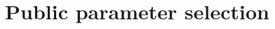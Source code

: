 \documentclass{llncs}
\newcommand{\F}{\mathbb{F}}
\newcommand{\algstyle}[1]{\textsc{#1}}
\begin{document}


\section{Public parameter selection}
\label{sec:initcurve}
\end{document}
